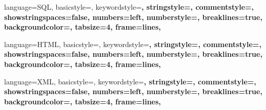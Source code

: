  {
  language=SQL,
  basicstyle=\ttfamily\small,
  keywordstyle=\color{blue}\bfseries,
  stringstyle=\color{string},
  commentstyle=\color{comentary},
  showstringspaces=false,
  numbers=left,
  numberstyle=\tiny,
  breaklines=true,
  backgroundcolor=\color{white},
  tabsize=4,
  frame=lines,
}

 {
  language=HTML,
  basicstyle=\ttfamily\small,
  keywordstyle=\color{red}\bfseries,
  stringstyle=\color{string},
  commentstyle=\color{comentary},
  showstringspaces=false,
  numbers=left,
  numberstyle=\tiny,
  breaklines=true,
  backgroundcolor=\color{white},
  tabsize=4,
  frame=lines,
}

 {
  language=XML,
  basicstyle=\ttfamily\small,
  keywordstyle=\color{purple}\bfseries,
  stringstyle=\color{string},
  commentstyle=\color{comentary},
  showstringspaces=false,
  numbers=left,
  numberstyle=\tiny,
  breaklines=true,
  backgroundcolor=\color{white},
  tabsize=4,
  frame=lines,
}

